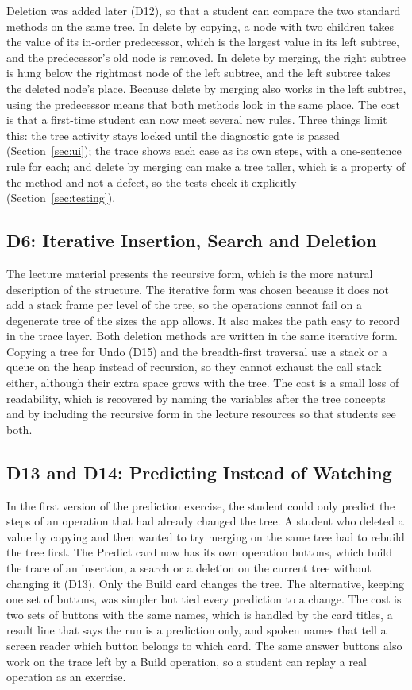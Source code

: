 Deletion was added later (D12), so that a student can compare the two standard methods on the same tree. In delete by copying, a node with two children takes the value of its in-order predecessor, which is the largest value in its left subtree, and the predecessor's old node is removed. In delete by merging, the right subtree is hung below the rightmost node of the left subtree, and the left subtree takes the deleted node's place. Because delete by merging also works in the left subtree, using the predecessor means that both methods look in the same place. The cost is that a first-time student can now meet several new rules. Three things limit this: the tree activity stays locked until the diagnostic gate is passed (Section~\ref{sec:ui}); the trace shows each case as its own steps, with a one-sentence rule for each; and delete by merging can make a tree taller, which is a property of the method and not a defect, so the tests check it explicitly (Section~\ref{sec:testing}).

\subsection{D6: Iterative Insertion, Search and Deletion}
The lecture material presents the recursive form, which is the more natural description of the structure. The iterative form was chosen because it does not add a stack frame per level of the tree, so the operations cannot fail on a degenerate tree of the sizes the app allows. It also makes the path easy to record in the trace layer. Both deletion methods are written in the same iterative form. Copying a tree for Undo (D15) and the breadth-first traversal use a stack or a queue on the heap instead of recursion, so they cannot exhaust the call stack either, although their extra space grows with the tree. The cost is a small loss of readability, which is recovered by naming the variables after the tree concepts and by including the recursive form in the lecture resources so that students see both.

\subsection{D13 and D14: Predicting Instead of Watching}
In the first version of the prediction exercise, the student could only predict the steps of an operation that had already changed the tree. A student who deleted a value by copying and then wanted to try merging on the same tree had to rebuild the tree first. The Predict card now has its own operation buttons, which build the trace of an insertion, a search or a deletion on the current tree without changing it (D13). Only the Build card changes the tree. The alternative, keeping one set of buttons, was simpler but tied every prediction to a change. The cost is two sets of buttons with the same names, which is handled by the card titles, a result line that says the run is a prediction only, and spoken names that tell a screen reader which button belongs to which card. The same answer buttons also work on the trace left by a Build operation, so a student can replay a real operation as an exercise.

